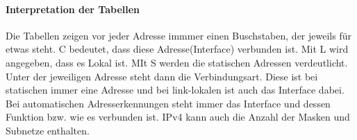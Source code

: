 \paragraph{Interpretation der Tabellen}
Die Tabellen zeigen vor jeder Adresse immmer einen Buschstaben, der jeweils für etwas steht. C bedeutet, dass diese Adresse(Interface) verbunden ist. Mit L wird angegeben, dass es Lokal ist. MIt S werden die statischen Adressen verdeutlicht.\\
Unter der jeweiligen Adresse steht dann die Verbindungsart. Diese ist bei statischen immer eine Adresse und bei link-lokalen ist auch das Interface dabei.
Bei automatischen Adresserkennungen steht immer das Interface und dessen Funktion bzw. wie es verbunden ist. IPv4 kann auch die Anzahl der Masken und Subnetze enthalten.